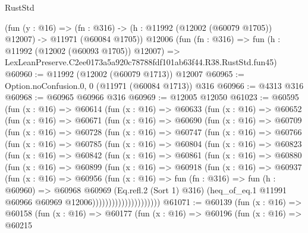 \begin{lexlean}{RustStd}
\begin{coremodule}
    (fun (y : @16) =>
    (fn : @316) -> (h : @11992 (@12002 (@60079 @1705)) @12007) -> @11971 (@60084 @1705))
    @12006
    (fun (fn : @316) =>
    fun (h : @11992 (@12002 (@60093 @1705)) @12007) =>
    LexLeanPreserve.C2ee0173a5a920c78788fdf101ab63f44.R38.RustStd.fun45)
@60960 := @11992 (@12002 (@60079 @1713)) @12007
@60965 := Option.noConfusion.{0, 0} (@11971 (@60084 @1713)) @316
@60966 := @4313 @316
@60968 := @60965 @60966 @316
@60969 := @12005 @12050
@61023 := @60595
    (fun (x : @16) =>
    @60614
      (fun (x : @16) =>
      @60633
        (fun (x : @16) =>
        @60652
          (fun (x : @16) =>
          @60671
            (fun (x : @16) =>
            @60690
              (fun (x : @16) =>
              @60709
                (fun (x : @16) =>
                @60728
                  (fun (x : @16) =>
                  @60747
                    (fun (x : @16) =>
                    @60766
                      (fun (x : @16) =>
                      @60785
                        (fun (x : @16) =>
                        @60804
                          (fun (x : @16) =>
                          @60823
                            (fun (x : @16) =>
                            @60842
                              (fun (x : @16) =>
                              @60861
                                (fun (x : @16) =>
                                @60880
                                  (fun (x : @16) =>
                                  @60899
                                    (fun (x : @16) =>
                                    @60918
                                      (fun (x : @16) =>
                                      @60937
                                        (fun (x : @16) =>
                                        @60956
                                          (fun (x : @16) =>
                                          fun (fn : @316) =>
                                          fun (h : @60960) =>
                                          @60968
                                            @60969
                                            (Eq.refl.{2} (Sort 1) @316)
                                            (heq_of_eq.{1}
                                              @11991
                                              @60966
                                              @60969
                                              @12006)))))))))))))))))))))
@61071 := @60139
    (fun (x : @16) =>
    @60158
      (fun (x : @16) =>
      @60177
        (fun (x : @16) =>
        @60196
          (fun (x : @16) =>
          @60215

\end{coremodule}
\end{lexlean}
